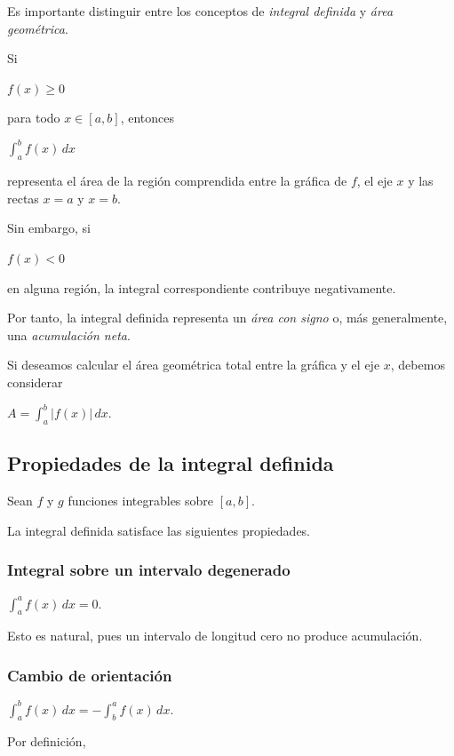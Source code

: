 \documentclass[12pt]{article}
\begin{document}
Es importante distinguir entre los conceptos de \emph{integral definida}
y \emph{área geométrica}.

Si

$
f(x)\geq0
$

para todo $x\in[a,b]$, entonces

$
\int_a^b f(x)\,dx
$

representa el área de la región comprendida entre la gráfica de $f$, el
eje $x$ y las rectas $x=a$ y $x=b$.

Sin embargo, si

$
f(x)<0
$

en alguna región, la integral correspondiente contribuye negativamente.

Por tanto, la integral definida representa un \emph{área con signo} o,
más generalmente, una \emph{acumulación neta}.

Si deseamos calcular el área geométrica total entre la gráfica y el eje
$x$, debemos considerar

$
\boxed{
A=\int_a^b |f(x)|\,dx.
}
$

\subsection*{Propiedades de la integral definida}

Sean $f$ y $g$ funciones integrables sobre $[a,b]$.

La integral definida satisface las siguientes propiedades.

\subsubsection*{Integral sobre un intervalo degenerado}

$
\boxed{
\int_a^a f(x)\,dx=0.
}
$

Esto es natural, pues un intervalo de longitud cero no produce acumulación.


\subsubsection*{Cambio de orientación}

$
\boxed{
\int_a^b f(x)\,dx
=
-\int_b^a f(x)\,dx.
}
$

Por definición,
\end{document}
